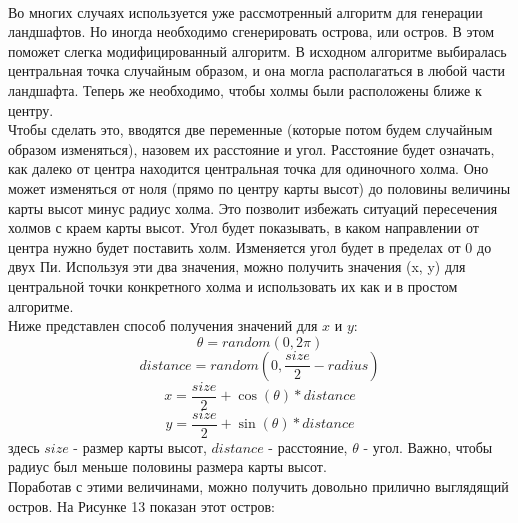\documentclass[a4paper, 10pt]{article}
\begin{document}
	\\ \hspace*{5mm} Во многих случаях используется уже рассмотренный алгоритм для генерации ландшафтов. Но иногда необходимо сгенерировать острова, или остров. В этом поможет слегка модифицированный алгоритм.
	В исходном алгоритме выбиралась центральная точка случайным образом, и она могла располагаться в любой части ландшафта. Теперь же необходимо, чтобы холмы были расположены ближе к центру.
	\\ \hspace*{5mm} Чтобы сделать это, вводятся две переменные (которые потом будем случайным образом изменяться), назовем их расстояние и угол. Расстояние будет означать, как далеко от центра находится центральная точка для одиночного холма. Оно может изменяться от ноля (прямо по центру карты высот) до половины величины карты высот минус радиус холма. Это позволит избежать ситуаций пересечения холмов с краем карты высот. Угол будет показывать, в каком направлении от центра нужно будет поставить холм. Изменяется угол будет в пределах от 0 до двух Пи. Используя эти два значения, можно получить значения (x, y) для центральной точки конкретного холма и использовать их как и в простом алгоритме.
	\\ Ниже представлен способ получения значений для $x$ и $y$:
	\begin{equation}
		\theta = random(0, 2\pi)
	\end{equation}
	\begin{equation}
		distance = random(0, \frac{size}{2} - radius)
	\end{equation}
	\begin{equation}
		x = \frac{size}{2} + \cos(\theta) * distance
	\end{equation}
	\begin{equation}
		y = \frac{size}{2} + \sin(\theta) * distance
	\end{equation}
	здесь $size$ - размер карты высот, $distance$ - расстояние, $\theta$ - угол. Важно, чтобы радиус был меньше половины размера карты высот.
	\\Поработав с этими величинами, можно получить довольно прилично выглядящий остров. На Рисунке 13 показан этот остров:
	\clearpage
	\newpage
\end{document}
